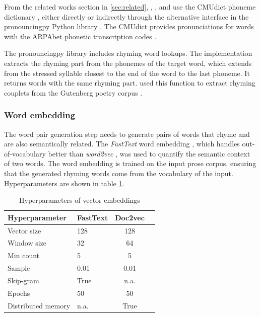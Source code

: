 \documentclass[11pt,a4paper]{article}
\begin{document}
From the related works section in \ref{sec:related}, \citet{keswarani}, \citet{cole}, and \citet{hopkins-kiela-2017} use the CMUdict phoneme dictionary \cite{cmudict}, either directly or indirectly through the alternative interface in the pronouncingpy Python library \cite{pronouncingpy}. The CMUdict provides pronunciations for words with the ARPAbet phonetic transcription codes \cite[Chapter~27]{jurafsky}.

The pronouncingpy library includes rhyming word lookups. The implementation extracts the rhyming part from the phonemes of the target word, which extends from the stressed syllable closest to the end of the word to the last phoneme. It returns words with the same rhyming part. \citet{cole} used this function to extract rhyming couplets from the Gutenberg poetry corpus \cite{gutenbergpoetry}.

\subsubsection{Word embedding}
\label{sec:fasttext}

The word pair generation step needs to generate pairs of words that rhyme and are also semantically related. The \textit{FastText} word embedding \cite{fasttext}, which handles out-of-vocabulary better than \textit{word2vec} \cite{wordvec}, was used to quantify the semantic context of two words. The word embedding is trained on the input prose corpus, ensuring that the generated rhyming words come from the vocabulary of the input. Hyperparameters are shown in table \ref{table:HP_fasttext}.

\begin{table}[ht]
\centering
\begin{tabular}{ll c c}
	\hline\hline
	Hyperparameter & FastText & Doc2vec \\ [0.5ex]
	\hline\hline
	Vector size & 128 & 128 \\ [0.5ex]
	Window size & 32 & 64 \\ [0.5ex]
	Min count & 5 & 5 \\ [0.5ex]
	Sample & 0.01 & 0.01 \\ [0.5ex]
	Skip-gram & True & n.a. \\ [0.5ex]
	Epochs & 50 & 50 \\ [0.5ex]
	Distributed memory & n.a. & True \\ [0.5ex]
	\hline
\end{tabular}
\caption{Hyperparameters of vector embeddings}
\label{table:HP_fasttext}
\end{table}
\end{document}
